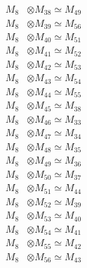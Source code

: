 \begin{align*}
M_{8} &\otimes M_{38} \simeq M_{49} \\
M_{8} &\otimes M_{39} \simeq M_{56} \\
M_{8} &\otimes M_{40} \simeq M_{51} \\
M_{8} &\otimes M_{41} \simeq M_{52} \\
M_{8} &\otimes M_{42} \simeq M_{53} \\
M_{8} &\otimes M_{43} \simeq M_{54} \\
M_{8} &\otimes M_{44} \simeq M_{55} \\
M_{8} &\otimes M_{45} \simeq M_{38} \\
M_{8} &\otimes M_{46} \simeq M_{33} \\
M_{8} &\otimes M_{47} \simeq M_{34} \\
M_{8} &\otimes M_{48} \simeq M_{35} \\
M_{8} &\otimes M_{49} \simeq M_{36} \\
M_{8} &\otimes M_{50} \simeq M_{37} \\
M_{8} &\otimes M_{51} \simeq M_{44} \\
M_{8} &\otimes M_{52} \simeq M_{39} \\
M_{8} &\otimes M_{53} \simeq M_{40} \\
M_{8} &\otimes M_{54} \simeq M_{41} \\
M_{8} &\otimes M_{55} \simeq M_{42} \\
M_{8} &\otimes M_{56} \simeq M_{43} \\
\end{align*}

